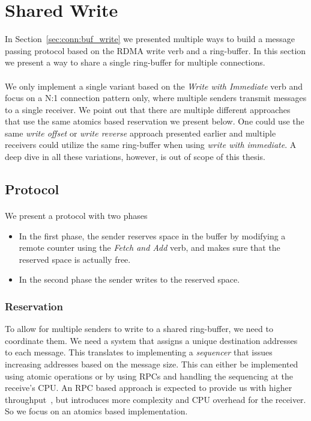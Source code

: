 \section{Shared Write} \label{sec:conn:shared_write}
In Section~\ref{sec:conn:buf_write} we presented multiple ways to build a message passing protocol based on the 
RDMA write verb and a ring-buffer. In this section we present a way to share a single ring-buffer for multiple connections.

\paragraph{} We only implement a single variant based on the \emph{Write with Immediate} verb and 
focus on a N:1 connection pattern only,
where multiple senders transmit messages to a single receiver.
We point out that there are multiple different approaches that use the same atomics based reservation we present below. One
could use the same \emph{write offset} or \emph{write reverse} approach presented earlier and multiple receivers could
utilize the same ring-buffer when using \emph{write with immediate}. A deep dive in all these variations, however, is out
of scope of this thesis.

\subsection{Protocol}

\paragraph{} We present a protocol with two phases

\begin{itemize}
  \item In the first phase, the sender reserves space in the buffer by modifying a remote counter using 
    the \emph{Fetch and Add} verb, and makes sure that the reserved space is actually free.
  \item In the second phase the sender writes to the reserved space.
\end{itemize}
\subsubsection{Reservation}
To allow for multiple senders to write to a shared ring-buffer, we need to coordinate them. We need a system that 
assigns a unique destination addresses to each message. This translates to implementing a \emph{sequencer} that issues
increasing addresses based on the message size. This can either be implemented using atomic operations or by using RPCs
and handling the sequencing at the receive's CPU. An RPC based approach is expected to provide us with higher 
throughput~\cite{anuj-guide}, but introduces more complexity and CPU overhead for the receiver. So we focus on an atomics based 
implementation.

